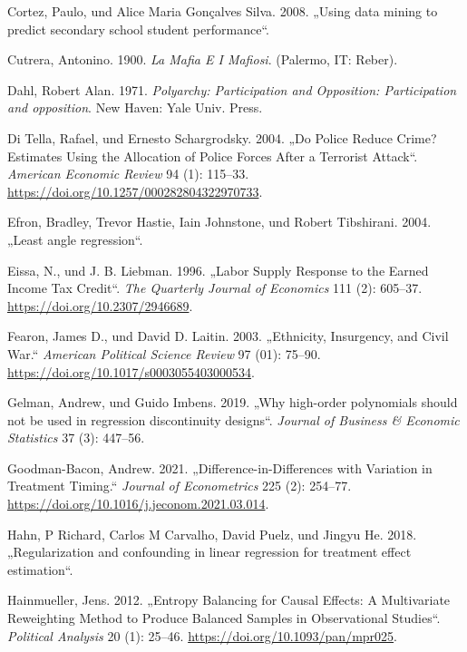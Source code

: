 \documentclass[
  a4paper,
  DIV=11,
  oneside]{scrreprt}
\newlength{\cslhangindent}
\newenvironment{CSLReferences}[2] %
 {\begin{list}{}{%
  \setlength{\itemindent}{0pt}
  \setlength{\leftmargin}{0pt}
  \setlength{\parsep}{0pt}
  \ifodd #1
   \setlength{\leftmargin}{\cslhangindent}
   \setlength{\itemindent}{-1\cslhangindent}
  \fi
  \setlength{\itemsep}{#2\baselineskip}}}
 {\end{list}}
\begin{document}
\begin{CSLReferences}{1}{0}
Cortez, Paulo, und Alice Maria Gonçalves Silva. 2008. {„Using data
mining to predict secondary school student performance``}.

Cutrera, Antonino. 1900. \emph{{La Mafia E I Mafiosi}}. (Palermo, IT:
Reber).

Dahl, Robert Alan. 1971. \emph{Polyarchy: Participation and Opposition:
Participation and opposition}. New Haven: Yale Univ. Press.

Di Tella, Rafael, und Ernesto Schargrodsky. 2004. {„Do Police Reduce
Crime? Estimates Using the Allocation of Police Forces After a Terrorist
Attack``}. \emph{American Economic Review} 94 (1): 115--33.
\url{https://doi.org/10.1257/000282804322970733}.

Efron, Bradley, Trevor Hastie, Iain Johnstone, und Robert Tibshirani.
2004. {„Least angle regression``}.

Eissa, N., und J. B. Liebman. 1996. {„Labor Supply Response to the
Earned Income Tax Credit``}. \emph{The Quarterly Journal of Economics}
111 (2): 605--37. \url{https://doi.org/10.2307/2946689}.

Fearon, James D., und David D. Laitin. 2003. {„Ethnicity, Insurgency,
and Civil War.``} \emph{American Political Science Review} 97 (01):
75--90. \url{https://doi.org/10.1017/s0003055403000534}.

Gelman, Andrew, und Guido Imbens. 2019. {„Why high-order polynomials
should not be used in regression discontinuity designs``}. \emph{Journal
of Business \& Economic Statistics} 37 (3): 447--56.

Goodman-Bacon, Andrew. 2021. {„Difference-in-Differences with Variation
in Treatment Timing.``} \emph{Journal of Econometrics} 225 (2): 254--77.
\url{https://doi.org/10.1016/j.jeconom.2021.03.014}.

Hahn, P Richard, Carlos M Carvalho, David Puelz, und Jingyu He. 2018.
{„Regularization and confounding in linear regression for treatment
effect estimation``}.

Hainmueller, Jens. 2012. {„Entropy Balancing for Causal Effects: A
Multivariate Reweighting Method to Produce Balanced Samples in
Observational Studies``}. \emph{Political Analysis} 20 (1): 25--46.
\url{https://doi.org/10.1093/pan/mpr025}.


\end{CSLReferences}
\end{document}
